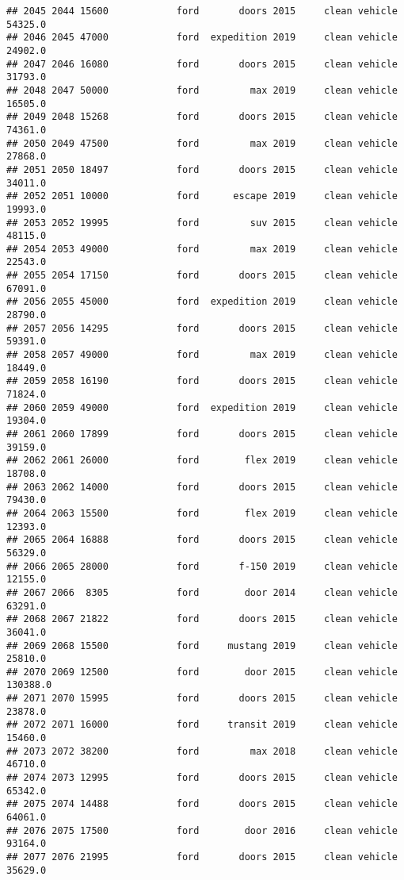\documentclass[
]{article}
\begin{document}
\begin{verbatim}
## 2045 2044 15600            ford       doors 2015     clean vehicle   54325.0
## 2046 2045 47000            ford  expedition 2019     clean vehicle   24902.0
## 2047 2046 16080            ford       doors 2015     clean vehicle   31793.0
## 2048 2047 50000            ford         max 2019     clean vehicle   16505.0
## 2049 2048 15268            ford       doors 2015     clean vehicle   74361.0
## 2050 2049 47500            ford         max 2019     clean vehicle   27868.0
## 2051 2050 18497            ford       doors 2015     clean vehicle   34011.0
## 2052 2051 10000            ford      escape 2019     clean vehicle   19993.0
## 2053 2052 19995            ford         suv 2015     clean vehicle   48115.0
## 2054 2053 49000            ford         max 2019     clean vehicle   22543.0
## 2055 2054 17150            ford       doors 2015     clean vehicle   67091.0
## 2056 2055 45000            ford  expedition 2019     clean vehicle   28790.0
## 2057 2056 14295            ford       doors 2015     clean vehicle   59391.0
## 2058 2057 49000            ford         max 2019     clean vehicle   18449.0
## 2059 2058 16190            ford       doors 2015     clean vehicle   71824.0
## 2060 2059 49000            ford  expedition 2019     clean vehicle   19304.0
## 2061 2060 17899            ford       doors 2015     clean vehicle   39159.0
## 2062 2061 26000            ford        flex 2019     clean vehicle   18708.0
## 2063 2062 14000            ford       doors 2015     clean vehicle   79430.0
## 2064 2063 15500            ford        flex 2019     clean vehicle   12393.0
## 2065 2064 16888            ford       doors 2015     clean vehicle   56329.0
## 2066 2065 28000            ford       f-150 2019     clean vehicle   12155.0
## 2067 2066  8305            ford        door 2014     clean vehicle   63291.0
## 2068 2067 21822            ford       doors 2015     clean vehicle   36041.0
## 2069 2068 15500            ford     mustang 2019     clean vehicle   25810.0
## 2070 2069 12500            ford        door 2015     clean vehicle  130388.0
## 2071 2070 15995            ford       doors 2015     clean vehicle   23878.0
## 2072 2071 16000            ford     transit 2019     clean vehicle   15460.0
## 2073 2072 38200            ford         max 2018     clean vehicle   46710.0
## 2074 2073 12995            ford       doors 2015     clean vehicle   65342.0
## 2075 2074 14488            ford       doors 2015     clean vehicle   64061.0
## 2076 2075 17500            ford        door 2016     clean vehicle   93164.0
## 2077 2076 21995            ford       doors 2015     clean vehicle   35629.0

\end{verbatim}
\end{document}
